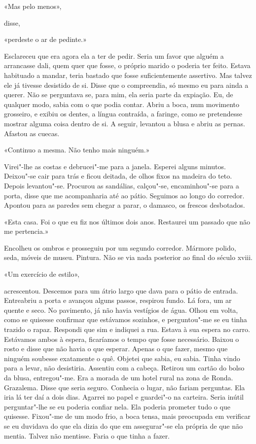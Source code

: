 «Mas pelo menos»,

disse,

«perdeste o ar de pedinte.»

Esclareceu que era agora ela a ter de pedir. Seria um favor que alguém a
arrancasse dali, quem quer que fosse, o próprio marido o poderia ter
feito. Estava habituado a mandar, teria bastado que fosse
suficientemente assertivo. Mas talvez ele já tivesse desistido de si.
Disse que o compreendia, só mesmo eu para ainda a querer. Não se
perguntava se, para mim, ela seria parte da expiação. Eu, de qualquer
modo, sabia com o que podia contar. Abriu a boca, num movimento
grosseiro, e exibiu os dentes, a língua contraída, a faringe, como se
pretendesse mostrar alguma coisa dentro de si. A seguir, levantou a
blusa e abriu as pernas. Afastou as cuecas.

«Continuo a mesma. Não tenho mais ninguém.»

Virei"-lhe as costas e debrucei"-me para a janela. Esperei alguns
minutos. Deixou"-se cair para trás e ficou deitada, de olhos fixos na
madeira do teto. Depois levantou"-se. Procurou as sandálias,
calçou"-se, encaminhou"-se para a porta, disse que me acompanharia até
ao pátio. Seguimos ao longo do corredor. Apontou para as paredes sem
chegar a parar, o damasco, os frescos desbotados.

«Esta casa. Foi o que eu fiz nos últimos dois anos. Restaurei um passado
que não me pertencia.»

Encolheu os ombros e prosseguiu por um segundo corredor. Mármore polido,
seda, móveis de museu. Pintura. Não se via nada posterior ao final do
século xviii.

«Um exercício de estilo»,

acrescentou. Descemos para um átrio largo que dava para o pátio de
entrada. Entreabriu a porta e avançou alguns passos, respirou fundo. Lá
fora, um ar quente e seco. No pavimento, já não havia vestígios de água.
Olhou em volta, como se quisesse confirmar que estávamos sozinhos, e
perguntou"-me se eu tinha trazido o rapaz. Respondi que sim e indiquei a
rua. Estava à sua espera no carro. Estávamos ambos à espera, ficaríamos
o tempo que fosse necessário. Baixou o rosto e disse que não havia o que
esperar. Apenas o que fazer, mesmo que ninguém soubesse exatamente o
quê. Objetei que sabia, eu sabia. Tinha vindo para a levar, não
desistiria. Assentiu com a cabeça. Retirou um cartão do bolso da blusa,
entregou"-me. Era a morada de um hotel rural na zona de Ronda.
Grazalema. Disse que seria seguro. Conhecia o lugar, não fariam
perguntas. Ela iria lá ter daí a dois dias. Agarrei no papel e
guardei"-o na carteira. Seria inútil perguntar"-lhe se eu poderia
confiar nela. Ela poderia prometer tudo o que quisesse. Fixou"-me de um
modo frio, a boca tensa, mais preocupada em verificar se eu duvidava do
que ela dizia do que em assegurar"-se ela própria de que não mentia.
Talvez não mentisse. Faria o que tinha a fazer.

